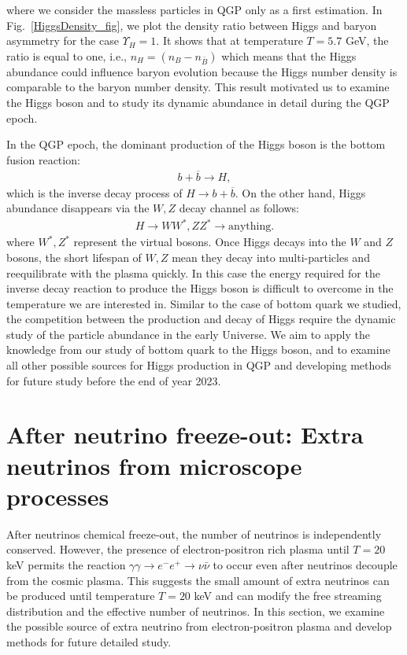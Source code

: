 where we consider the massless particles in QGP only as a first estimation. In Fig.~\ref{HiggsDensity_fig}, we plot the density ratio between Higgs and baryon asymmetry for the case $\Upsilon_H=1$. It shows that at temperature $T=5.7$ GeV, the ratio is equal to one, i.e., $n_H=(n_B-n_{\bar{B}})$ which means that the Higgs abundance could influence baryon evolution because the Higgs number density is comparable to the baryon number density. This result motivated us to examine the Higgs boson and to study its dynamic abundance in detail during the QGP epoch.

In the QGP epoch, the dominant production of the Higgs boson is the bottom fusion reaction: 
\begin{align}
b+\overline{b}\longrightarrow H,
\end{align}
which is the inverse decay process of $H\to b+\overline{b}$. On the other hand, Higgs abundance disappears via the $W,Z$ decay channel as follows:
\begin{align}
H\longrightarrow WW^\ast, ZZ^\ast\longrightarrow\mathrm{anything}.
\end{align}
where $W^\ast,Z^\ast$ represent the virtual bosons. Once Higgs decays into the $W$ and $Z$ bosons, the short lifespan of $W,Z$ mean they decay into multi-particles and reequilibrate with the plasma quickly. In this case
the energy required for the inverse decay reaction to produce the Higgs boson is difficult to overcome in the temperature we are interested in. Similar to the case of bottom quark we studied, the competition between the production and decay of Higgs require the dynamic study of the particle abundance in the early Universe. We aim to apply the knowledge from our study of bottom quark to the Higgs boson, and to examine all other possible sources for Higgs production in QGP and developing methods for future study before the end of year 2023.






\section{{After neutrino freeze-out: Extra neutrinos from microscope processes}}

After neutrinos chemical freeze-out, the number of neutrinos is independently conserved. However, the presence of electron-positron rich plasma until $T=20$ keV permits the reaction $\gamma\gamma\to e^-e^+\to\nu\bar{\nu}$ to occur even after neutrinos decouple from the cosmic plasma. This suggests the small amount of extra neutrinos can be produced until temperature $T=20$ keV and can modify the free streaming distribution and the effective number of neutrinos. In this section, we examine the possible source of extra neutrino from electron-positron plasma and develop methods for
future detailed study.

